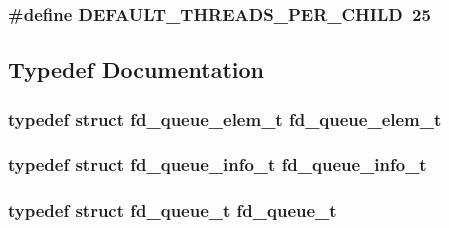 \subsubsection[{\texorpdfstring{D\+E\+F\+A\+U\+L\+T\+\_\+\+T\+H\+R\+E\+A\+D\+S\+\_\+\+P\+E\+R\+\_\+\+C\+H\+I\+LD}{DEFAULT_THREADS_PER_CHILD}}]{\setlength{\rightskip}{0pt plus 5cm}\#define D\+E\+F\+A\+U\+L\+T\+\_\+\+T\+H\+R\+E\+A\+D\+S\+\_\+\+P\+E\+R\+\_\+\+C\+H\+I\+LD~25}\hypertarget{group__APACHE__MPM__WORKER_gaf3e2d0fe4c45aac538a61bf99d69a378}{}\label{group__APACHE__MPM__WORKER_gaf3e2d0fe4c45aac538a61bf99d69a378}


\subsection{Typedef Documentation}
\subsubsection[{\texorpdfstring{fd\+\_\+queue\+\_\+elem\+\_\+t}{fd_queue_elem_t}}]{\setlength{\rightskip}{0pt plus 5cm}typedef struct {\bf fd\+\_\+queue\+\_\+elem\+\_\+t} {\bf fd\+\_\+queue\+\_\+elem\+\_\+t}}\hypertarget{group__APACHE__MPM__WORKER_ga05898396eb6f09bf84cdf03f6c4bea00}{}\label{group__APACHE__MPM__WORKER_ga05898396eb6f09bf84cdf03f6c4bea00}
\subsubsection[{\texorpdfstring{fd\+\_\+queue\+\_\+info\+\_\+t}{fd_queue_info_t}}]{\setlength{\rightskip}{0pt plus 5cm}typedef struct {\bf fd\+\_\+queue\+\_\+info\+\_\+t} {\bf fd\+\_\+queue\+\_\+info\+\_\+t}}\hypertarget{group__APACHE__MPM__WORKER_gae60bd20f632fdf018c59af8943651458}{}\label{group__APACHE__MPM__WORKER_gae60bd20f632fdf018c59af8943651458}
\subsubsection[{\texorpdfstring{fd\+\_\+queue\+\_\+t}{fd_queue_t}}]{\setlength{\rightskip}{0pt plus 5cm}typedef struct {\bf fd\+\_\+queue\+\_\+t} {\bf fd\+\_\+queue\+\_\+t}}\hypertarget{group__APACHE__MPM__WORKER_gaecd41846d40f5570725f5cd670a3181b}{}\label{group__APACHE__MPM__WORKER_gaecd41846d40f5570725f5cd670a3181b}



